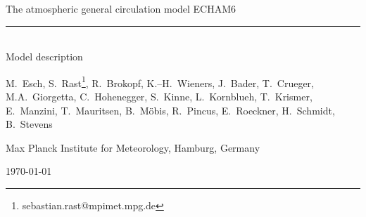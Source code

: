 \documentclass[DIV14,BCOR1cm,11pt,a4paper,twoside]{scrreprt}
\begin{document}
\thispagestyle{empty}

\renewcommand{\footnoterule}{\rule{0pt}{0pt}\vspace{0pt}}

\begin{center}
\ifpdf
\else
\fi
\end{center}

\vspace{3cm}

\begin{center}
{ 
The atmospheric general circulation model ECHAM6\\[0.5ex]
\rule{5cm}{0.7mm}\\[2.5ex]
Model description
}
\end{center}

\vspace{3cm}

\begin{center}
{ 
M.~Esch, S.~Rast\footnote{sebastian.rast@mpimet.mpg.de},
R.~Brokopf, K.--H.~Wieners, J.~Bader, T.~Crueger, M.A.~Giorgetta, C.~Hohenegger,
S.~Kinne, L.~Kornblueh, T.~Krismer, E.~Manzini, T.~Mauritsen,
B.~M\"obis, R.~Pincus, E.~Roeckner, H.~Schmidt, B.~Stevens}
\end{center}

\vspace{2cm}

\begin{center}
{ 
Max Planck Institute for Meteorology, Hamburg, Germany\\

\vspace{2cm}

\today}
\end{center}
\newpage
\rule{0cm}{1cm}
\thispagestyle{empty}
\newpage


\tableofcontents

\listoftables

\listoffigures

\cleardoublepage
\end{document}
